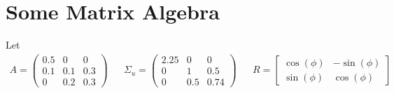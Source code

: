\documentclass[a4paper]{scrartcl}
\newif\ifpartSVAR  %
\begin{document}
\ifpartSVAR %


\section{Some Matrix Algebra}
Let
	\begin{align*}
	A = \begin{pmatrix}0.5 &0 &0 \\0.1&0.1&0.3\\0&0.2&0.3 \end{pmatrix} && \Sigma_u = \begin{pmatrix}2.25 & 0 & 0\\ 0 & 1 & 0.5\\ 0 & 0.5 & 0.74 \end{pmatrix} && R = \begin{bmatrix} \cos(\phi) & -\sin(\phi)\\ \sin(\phi) & \cos(\phi) \end{bmatrix}
	\end{align*}
\end{document}
